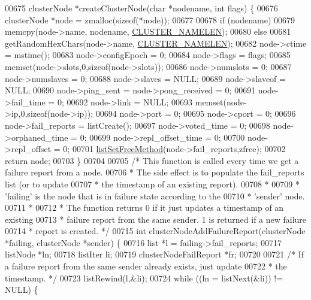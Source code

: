 \begin{DoxyCode}
{{{{{{{{{{{00675 clusterNode *createClusterNode(\textcolor{keywordtype}{char} *nodename, \textcolor{keywordtype}{int} flags) \{
00676     clusterNode *node = zmalloc(\textcolor{keyword}{sizeof}(*node));
00677 
00678     \textcolor{keywordflow}{if} (nodename)
00679         memcpy(node->name, nodename, \hyperlink{cluster_8h_ace7a882972eff7149675252938643b6e}{CLUSTER\_NAMELEN});
00680     \textcolor{keywordflow}{else}
00681         getRandomHexChars(node->name, \hyperlink{cluster_8h_ace7a882972eff7149675252938643b6e}{CLUSTER\_NAMELEN});
00682     node->ctime = mstime();
00683     node->configEpoch = 0;
00684     node->flags = flags;
00685     memset(node->slots,0,\textcolor{keyword}{sizeof}(node->slots));
00686     node->numslots = 0;
00687     node->numslaves = 0;
00688     node->slaves = NULL;
00689     node->slaveof = NULL;
00690     node->ping\_sent = node->pong\_received = 0;
00691     node->fail\_time = 0;
00692     node->link = NULL;
00693     memset(node->ip,0,\textcolor{keyword}{sizeof}(node->ip));
00694     node->port = 0;
00695     node->cport = 0;
00696     node->fail\_reports = listCreate();
00697     node->voted\_time = 0;
00698     node->orphaned\_time = 0;
00699     node->repl\_offset\_time = 0;
00700     node->repl\_offset = 0;
00701     \hyperlink{adlist_8h_a648e4a2d20decff3182a72a608b0b8f2}{listSetFreeMethod}(node->fail\_reports,zfree);
00702     \textcolor{keywordflow}{return} node;
00703 \}
00704 
00705 \textcolor{comment}{/* This function is called every time we get a failure report from a node.}
00706 \textcolor{comment}{ * The side effect is to populate the fail\_reports list (or to update}
00707 \textcolor{comment}{ * the timestamp of an existing report).}
00708 \textcolor{comment}{ *}
00709 \textcolor{comment}{ * 'failing' is the node that is in failure state according to the}
00710 \textcolor{comment}{ * 'sender' node.}
00711 \textcolor{comment}{ *}
00712 \textcolor{comment}{ * The function returns 0 if it just updates a timestamp of an existing}
00713 \textcolor{comment}{ * failure report from the same sender. 1 is returned if a new failure}
00714 \textcolor{comment}{ * report is created. */}
00715 \textcolor{keywordtype}{int} clusterNodeAddFailureReport(clusterNode *failing, clusterNode *sender) \{
00716     list *l = failing->fail\_reports;
00717     listNode *ln;
00718     listIter li;
00719     clusterNodeFailReport *fr;
00720 
00721     \textcolor{comment}{/* If a failure report from the same sender already exists, just update}
00722 \textcolor{comment}{     * the timestamp. */}
00723     listRewind(l,&li);
00724     \textcolor{keywordflow}{while} ((ln = listNext(&li)) != NULL) \{
}}}}}}}}}}}
\end{DoxyCode}
